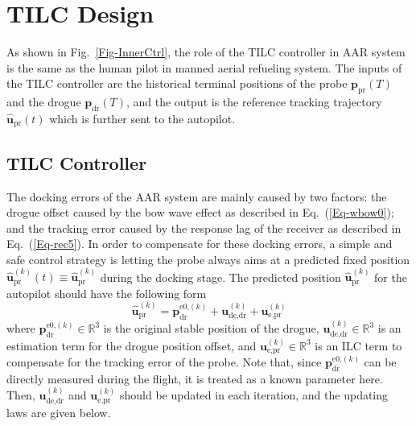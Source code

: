 \section{TILC Design}

\label{Sec-3}

As shown in Fig.\ \ref{Fig-InnerCtrl}, the role of the TILC controller
in AAR system is the same as the human pilot in manned aerial refueling
system. The inputs of the TILC controller are the historical terminal
positions of the probe ${\mathbf{p}}_{\text{pr}}\left(T\right)$ and
the drogue ${\mathbf{p}}_{\text{dr}}\left(T\right)$, and the output
is the reference tracking trajectory $\mathbf{\hat{u}}_{\text{pr}}\left(t\right)$
which is further sent to the autopilot.

\subsection{TILC Controller}

The docking errors of the AAR system are mainly caused by two factors:
the drogue offset caused by the bow wave effect as described in Eq.~(\ref{Eq-wbow0});
and the tracking error caused by the response lag of the receiver
as described in Eq.~(\ref{Eq-rec5}). In order to compensate for
these docking errors, a simple and safe control strategy is letting
the probe always aims at a predicted fixed position $\mathbf{\hat{u}}_{\text{pr}}^{\left(k\right)}\left(t\right)\equiv\mathbf{\hat{u}}_{\text{pr}}^{\left(k\right)}$
during the docking stage. The predicted position $\mathbf{\hat{u}}_{\text{pr}}^{\left(k\right)}$
for the autopilot should have the following form
\begin{equation}
\mathbf{\hat{u}}_{\text{pr}}^{\left(k\right)}={\mathbf{p}}_{\text{dr}}^{\text{e0,}\left(k\right)}+\mathbf{u}_{\text{de,dr}}^{\left(k\right)}+\mathbf{u}_{\text{e,pr}}^{\left(k\right)}\label{Eq-Stg1-0}
\end{equation}
where ${\mathbf{p}}_{\text{dr}}^{\text{e0,}\left(k\right)}\in%
\mathbb{R}%
^{3}$ is the original stable position of the drogue, $\mathbf{u}_{\text{de,dr}}^{\left(k\right)}\in%
\mathbb{R}%
^{3}$ is an estimation term for the drogue position offset, and $\mathbf{u}_{\text{e,pr}}^{\left(k\right)}\in%
\mathbb{R}%
^{3}$ is an ILC term to compensate for the tracking error of the probe.
Note that, since ${\mathbf{p}}_{\text{dr}}^{\text{e0,}\left(k\right)}$
can be directly measured during the flight, it is treated as a known
parameter here. Then, $\mathbf{u}_{\text{de,dr}}^{\left(k\right)}$
and $\mathbf{u}_{\text{e,pr}}^{\left(k\right)}$ should be updated
in each iteration, and the updating laws are given below.

